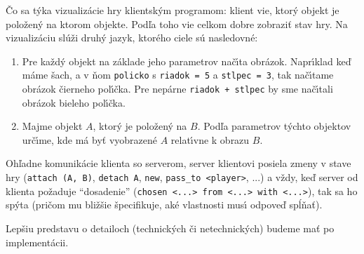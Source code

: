 \documentclass[a4paper,12pt]{article}
\begin{document}
\v{C}o sa t\'{y}ka vizualiz\'{a}cie hry klientsk\'{y}m programom:
klient vie, ktor\'{y} objekt je polo\v{z}en\'{y} na ktorom objekte.
Pod\v{l}a toho vie celkom dobre zobrazi\v{t} stav hry. Na vizualiz\'{a}ciu
sl\'{u}\v{z}i druh\'{y} jazyk, ktor\'{e}ho ciele s\'{u} nasledovn\'{e}:
\begin{enumerate}
    \item Pre ka\v{z}d\'{y} objekt na z\'{a}klade jeho parametrov
    na\v{c}\'{\i}ta obr\'{a}zok. Napr\'{\i}klad ke\v{d} m\'{a}me
    \v{s}ach, a v \v{n}om \verb|policko| s \verb|riadok = 5| a \verb|stlpec = 3|,
    tak na\v{c}\'{\i}tame obr\'{a}zok \v{c}ierneho pol\'{\i}\v{c}ka.
    Pre nep\'{a}rne \verb|riadok + stlpec| by sme na\v{c}\'{\i}tali
    obr\'{a}zok bieleho pol\'{\i}\v{c}ka.
    \item Majme objekt $A$, ktor\'{y} je polo\v{z}en\'{y} na $B$.
    Pod\v{l}a parametrov t\'{y}chto objektov ur\v{c}\'{\i}me,
    kde m\'{a} by\v{t} vyobrazen\'{e} $A$ relat\'{\i}vne k obrazu $B$.
\end{enumerate}

Oh\v{l}adne komunik\'{a}cie klienta so serverom, server klientovi
posiela zmeny v stave hry (\verb|attach (A, B)|, \verb|detach A|, \verb|new|,
\verb|pass_to <player>|, ...) a v\v{z}dy, ke\v{d} server od klienta
po\v{z}aduje ``dosadenie'' (\verb|chosen <...> from <...> with <...>|),
tak sa ho sp\'{y}ta (pri\v{c}om mu bli\v{z}\v{s}ie \v{s}pecifikuje,
ak\'{e} vlastnosti mus\'{\i} odpove\v{d} sp\'{l}\v{n}a\v{t}).

Lep\v{s}iu predstavu o detailoch (technick\'{y}ch \v{c}i netechnick\'{y}ch)
budeme ma\v{t} po implement\'{a}cii.
\end{document}
